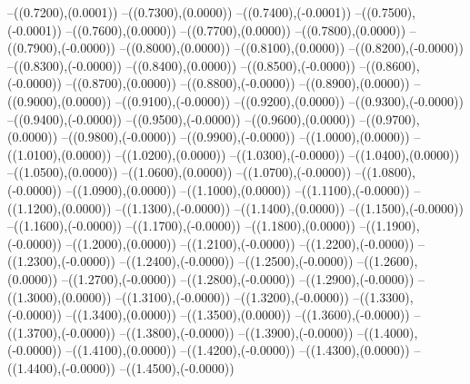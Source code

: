 {	--({\sx*(0.7200)},{\sy*(0.0001)})
	--({\sx*(0.7300)},{\sy*(0.0000)})
	--({\sx*(0.7400)},{\sy*(-0.0001)})
	--({\sx*(0.7500)},{\sy*(-0.0001)})
	--({\sx*(0.7600)},{\sy*(0.0000)})
	--({\sx*(0.7700)},{\sy*(0.0000)})
	--({\sx*(0.7800)},{\sy*(0.0000)})
	--({\sx*(0.7900)},{\sy*(-0.0000)})
	--({\sx*(0.8000)},{\sy*(0.0000)})
	--({\sx*(0.8100)},{\sy*(0.0000)})
	--({\sx*(0.8200)},{\sy*(-0.0000)})
	--({\sx*(0.8300)},{\sy*(-0.0000)})
	--({\sx*(0.8400)},{\sy*(0.0000)})
	--({\sx*(0.8500)},{\sy*(-0.0000)})
	--({\sx*(0.8600)},{\sy*(-0.0000)})
	--({\sx*(0.8700)},{\sy*(0.0000)})
	--({\sx*(0.8800)},{\sy*(-0.0000)})
	--({\sx*(0.8900)},{\sy*(0.0000)})
	--({\sx*(0.9000)},{\sy*(0.0000)})
	--({\sx*(0.9100)},{\sy*(-0.0000)})
	--({\sx*(0.9200)},{\sy*(0.0000)})
	--({\sx*(0.9300)},{\sy*(-0.0000)})
	--({\sx*(0.9400)},{\sy*(-0.0000)})
	--({\sx*(0.9500)},{\sy*(-0.0000)})
	--({\sx*(0.9600)},{\sy*(0.0000)})
	--({\sx*(0.9700)},{\sy*(0.0000)})
	--({\sx*(0.9800)},{\sy*(-0.0000)})
	--({\sx*(0.9900)},{\sy*(-0.0000)})
	--({\sx*(1.0000)},{\sy*(0.0000)})
	--({\sx*(1.0100)},{\sy*(0.0000)})
	--({\sx*(1.0200)},{\sy*(0.0000)})
	--({\sx*(1.0300)},{\sy*(-0.0000)})
	--({\sx*(1.0400)},{\sy*(0.0000)})
	--({\sx*(1.0500)},{\sy*(0.0000)})
	--({\sx*(1.0600)},{\sy*(0.0000)})
	--({\sx*(1.0700)},{\sy*(-0.0000)})
	--({\sx*(1.0800)},{\sy*(-0.0000)})
	--({\sx*(1.0900)},{\sy*(0.0000)})
	--({\sx*(1.1000)},{\sy*(0.0000)})
	--({\sx*(1.1100)},{\sy*(-0.0000)})
	--({\sx*(1.1200)},{\sy*(0.0000)})
	--({\sx*(1.1300)},{\sy*(-0.0000)})
	--({\sx*(1.1400)},{\sy*(0.0000)})
	--({\sx*(1.1500)},{\sy*(-0.0000)})
	--({\sx*(1.1600)},{\sy*(-0.0000)})
	--({\sx*(1.1700)},{\sy*(-0.0000)})
	--({\sx*(1.1800)},{\sy*(0.0000)})
	--({\sx*(1.1900)},{\sy*(-0.0000)})
	--({\sx*(1.2000)},{\sy*(0.0000)})
	--({\sx*(1.2100)},{\sy*(-0.0000)})
	--({\sx*(1.2200)},{\sy*(-0.0000)})
	--({\sx*(1.2300)},{\sy*(-0.0000)})
	--({\sx*(1.2400)},{\sy*(-0.0000)})
	--({\sx*(1.2500)},{\sy*(-0.0000)})
	--({\sx*(1.2600)},{\sy*(0.0000)})
	--({\sx*(1.2700)},{\sy*(-0.0000)})
	--({\sx*(1.2800)},{\sy*(-0.0000)})
	--({\sx*(1.2900)},{\sy*(-0.0000)})
	--({\sx*(1.3000)},{\sy*(0.0000)})
	--({\sx*(1.3100)},{\sy*(-0.0000)})
	--({\sx*(1.3200)},{\sy*(-0.0000)})
	--({\sx*(1.3300)},{\sy*(-0.0000)})
	--({\sx*(1.3400)},{\sy*(0.0000)})
	--({\sx*(1.3500)},{\sy*(0.0000)})
	--({\sx*(1.3600)},{\sy*(-0.0000)})
	--({\sx*(1.3700)},{\sy*(-0.0000)})
	--({\sx*(1.3800)},{\sy*(-0.0000)})
	--({\sx*(1.3900)},{\sy*(-0.0000)})
	--({\sx*(1.4000)},{\sy*(-0.0000)})
	--({\sx*(1.4100)},{\sy*(0.0000)})
	--({\sx*(1.4200)},{\sy*(-0.0000)})
	--({\sx*(1.4300)},{\sy*(0.0000)})
	--({\sx*(1.4400)},{\sy*(-0.0000)})
	--({\sx*(1.4500)},{\sy*(-0.0000)})
}
